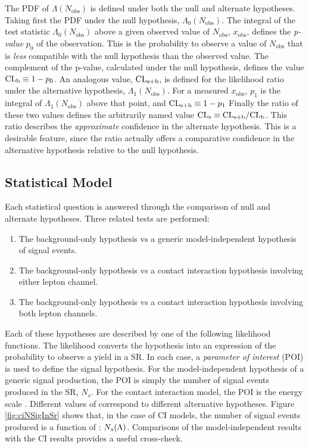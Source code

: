 The PDF of $\Lambda(N_\text{obs})$ is defined under both the null and alternate hypotheses.
Taking first the PDF under the null hypothesis, $\Lambda_0(N_\text{obs})$.
The integral of the test statistic $\Lambda_0(N_\text{obs})$ above a given observed value of $N_\text{obs}$, $x_\text{obs}$, defines the \emph{p-value} $p_0$ of the observation.
This is the probability to observe a value of $N_\text{obs}$ that is \emph{less} compatible with the null hypothesis than the observed value.
The complement of the p-value, calculated under the null hypothesis, defines the value $\text{CL}_\text{b}\equiv1-p_0$.
An analogous value, $\text{CL}_\text{s+b}$, is defined for the likelihood ratio under the alternative hypothesis, $\Lambda_1(N_\text{obs})$.
For a measured $x_\text{obs}$, $p_1$ is the integral of $\Lambda_1(N_\text{obs})$ above that point, and $\text{CL}_\text{s+b}\equiv1-p_1$
Finally the ratio of these two values defines the arbitrarily named value $\text{CL}_\text{s}\equiv \text{CL}_\text{s+b}/\text{CL}_\text{b}$.
This ratio describes the \emph{approximate} confidence in the alternate hypothesis.\cite{read}
This is a desirable feature, since the \cls ratio actually offers a comparative confidence in the alternative hypothesis relative to the null hypothesis.


\subsection{Statistical Model}\label{sec:ciStatModel}

Each statistical question is answered through the comparison of null and alternate hypotheses.
Three related tests are performed:
\begin{enumerate}
    \item The background-only hypothesis vs a generic model-independent hypothesis of signal events.
    \item The background-only hypothesis vs a contact interaction hypothesis involving either lepton channel.
    \item The background-only hypothesis vs a contact interaction hypothesis involving both lepton channels.
\end{enumerate}
Each of these hypotheses are described by one of the following likelihood functions.
The likelihood converts the hypothesis into an expression of the probability to observe a yield in a SR.
In each case, a \emph{parameter of interest} (POI) is used to define the signal hypothesis.
For the model-independent hypothesis of a generic signal production, the POI is simply the number of signal events produced in the SR, $N_s$.
For the contact interaction model, the POI is the energy scale \lam. Different values of \lam correspond to different alternative hypotheses.
Figure \ref{fig:ciNSigInSr} shows that, in the case of CI models, the number of signal events produced is a function of \lam: $N_s(\Lambda)$.
Comparisons of the model-independent results with the CI results provides a useful cross-check.

